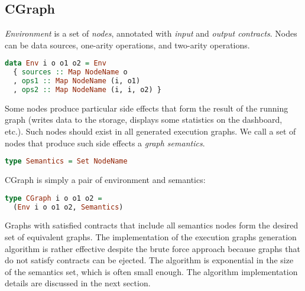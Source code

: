 \subsection{CGraph}

{\em Environment} is a set of {\em nodes}, annotated with {\em input} and {\em output contracts}.
Nodes can be data sources, one-arity operations, and two-arity operations.

\begin{lstlisting}[language=Haskell]
data Env i o o1 o2 = Env
  { sources :: Map NodeName o
  , ops1 :: Map NodeName (i, o1)
  , ops2 :: Map NodeName (i, i, o2) }
\end{lstlisting}

Some nodes produce particular side effects that form the result of the running graph (writes data to the storage, displays some statistics on the dashboard, etc.).
Such nodes should exist in all generated execution graphs.
We call a set of nodes that produce such side effects a {\em graph semantics}.

\begin{lstlisting}[language=Haskell]
type Semantics = Set NodeName
\end{lstlisting}

CGraph is simply a pair of environment and semantics:

\begin{lstlisting}[language=Haskell]
type CGraph i o o1 o2 =
  (Env i o o1 o2, Semantics)
\end{lstlisting}

Graphs with satisfied contracts that include all semantics nodes form the desired set of equivalent graphs.
The implementation of the execution graphs generation algorithm is rather effective despite the brute force approach because graphs that do not satisfy contracts can be ejected.
The algorithm is exponential in the size of the semantics set, which is often small enough.
The algorithm implementation details are discussed in the next section.
